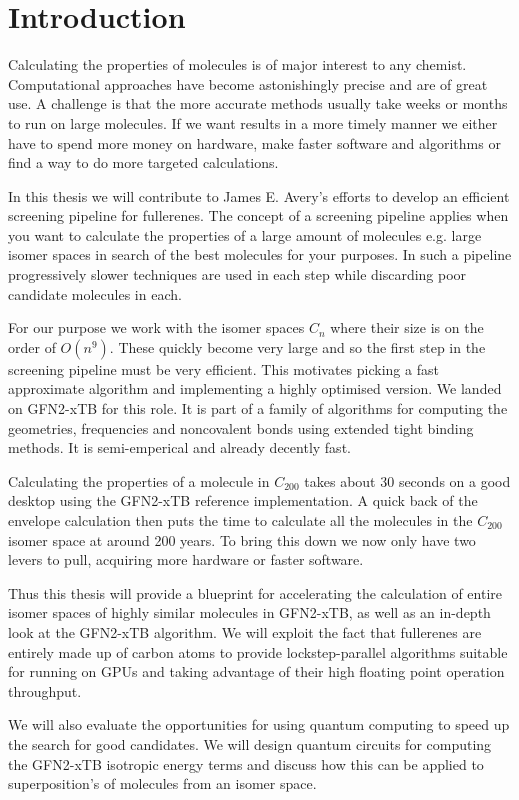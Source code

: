 \chapter{Introduction}
Calculating the properties of molecules is of major interest to any chemist. Computational approaches have become astonishingly precise and are of great use. A challenge is that the more accurate methods usually take weeks or months to run on large molecules. If we want results in a more timely manner we either have to spend more money on hardware, make faster software and algorithms or find a way to do more targeted calculations. 

In this thesis we will contribute to James E. Avery's efforts to develop an efficient screening pipeline for fullerenes. The concept of a screening pipeline applies when you want to calculate the properties of a large amount of molecules e.g. large isomer spaces in search of the best molecules for your purposes. In such a pipeline progressively slower techniques are used in each step while discarding poor candidate molecules in each. 

For our purpose we work with the isomer spaces $C_n$ where their size is on the order of $O(n^9)$.
These quickly become very large and so the first step in the screening pipeline must be very efficient. This motivates picking a fast approximate algorithm and implementing a highly optimised version.
We landed on GFN2-xTB for this role. It is part of a family of algorithms for computing the geometries, frequencies and noncovalent bonds using extended tight binding methods. It is semi-emperical and already decently fast. 

Calculating the properties of a molecule in $C_200$ takes about 30 seconds on a good desktop using the GFN2-xTB reference implementation. A quick back of the envelope calculation then puts the time to calculate all the molecules in the $C_200$ isomer space at around 200 years. To bring this down we now only have two levers to pull, acquiring more hardware or faster software. 

Thus this thesis will provide a blueprint for accelerating the calculation of entire isomer spaces of highly similar molecules in GFN2-xTB, as well as an in-depth look at the GFN2-xTB algorithm. We will exploit the fact that fullerenes are entirely made up of carbon atoms to provide lockstep-parallel algorithms suitable for running on GPUs and taking advantage of their high floating point operation throughput.

We will also evaluate the opportunities for using quantum computing to speed up the search for good candidates. We will design quantum circuits for computing the GFN2-xTB isotropic energy terms and discuss how this can be applied to superposition's of molecules from an isomer space. 

